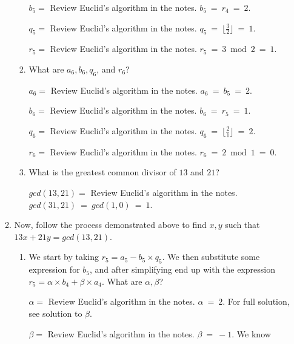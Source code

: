 \documentclass[11pt, preview]{standalone} %
\begin{document}
\begin{enumerate}
\begin{enumerate}
\begin{enumerate}
\begin{Freeform}{2}
$b_5 = $
\Hint Review Euclid's algorithm in the notes.
\Solution $b_5\ =\ r_4\ =\ 2$.
\end{Freeform}
\begin{Freeform}{1}
$q_5 = $
\Hint Review Euclid's algorithm in the notes.
\Solution $q_5\ =\ \lfloor \frac{3}{2} \rfloor\ =\ 1$.
\end{Freeform}
\begin{Freeform}{1}
$r_5 = $
\Hint Review Euclid's algorithm in the notes.
\Solution $r_5\ =\ 3 \bmod 2\ =\ 1$.
\end{Freeform}
\item What are $a_6, b_6, q_6$, and $r_6$?
\begin{Freeform}{2}
$a_6 = $
\Hint Review Euclid's algorithm in the notes.
\Solution $a_6\ =\ b_5\ =\ 2$.
\end{Freeform}
\begin{Freeform}{1}
$b_6 = $
\Hint Review Euclid's algorithm in the notes.
\Solution $b_6\ =\ r_5\ =\ 1$.
\end{Freeform}
\begin{Freeform}{2}
$q_6 = $
\Hint Review Euclid's algorithm in the notes.
\Solution $q_6\ =\ \lfloor \frac{2}{1} \rfloor\ =\ 2$.
\end{Freeform}
\begin{Freeform}{0}
$r_6 = $
\Hint Review Euclid's algorithm in the notes.
\Solution $r_6\ =\ 2 \bmod 1\ =\ 0$.
\end{Freeform}
\item What is the greatest common divisor of $13$ and $21$?
\begin{Freeform}{1}
$gcd(13,21) = $
\Hint Review Euclid's algorithm in the notes.
\Solution $gcd(31, 21)\ =\ gcd(1, 0)\ =\ 1$.
\end{Freeform}
\end{enumerate}
\item Now, follow the process demonstrated above to find $x, y$ such that $13x + 21y = gcd(13,21)$. 
\begin{enumerate}
\item We start by taking $r_5 = a_5 - b_5\times q_5$.  We then substitute some expression for $b_5$, and after simplifying end up with the expression $r_5 = \alpha \times b_4 + \beta \times a_4$. What are $\alpha, \beta$?
\begin{Freeform}{2}
$\alpha = $
\Hint Review Euclid's algorithm in the notes.
\Solution $\alpha\ =\ 2$. For full solution, see solution to $\beta$.
\end{Freeform}
\begin{Freeform}{-1}
$\beta = $
\Hint Review Euclid's algorithm in the notes.
\Solution $\beta\ =\ -1$. We know 


\end{Freeform}
\end{enumerate}
\end{enumerate}
\end{enumerate}
\end{document}
